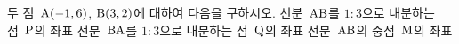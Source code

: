 두 점~$\mathrm{A}(-1{,}\mkern3mu\mathopen{}6)$, $\mathrm{B}(3{,}\mkern3mu\mathopen{}2)$에 대하여 다음을 구하시오.
 선분~$\mathrm{AB}$를 $1:3$으로 내분하는 점~$\mathrm{P}$의 좌표
 선분~$\mathrm{BA}$를 $1:3$으로 내분하는 점~$\mathrm{Q}$의 좌표
 선분~$\mathrm{AB}$의 중점~$\mathrm{M}$의 좌표
